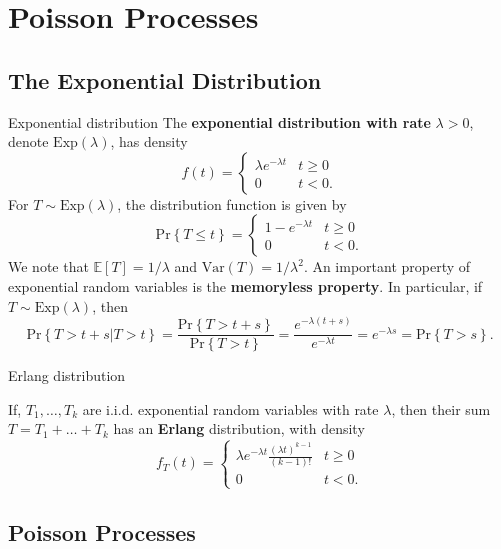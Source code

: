 \section{Poisson Processes}

\subsection{The Exponential Distribution}

\begin{defn}{Exponential distribution}{}
The \textbf{exponential distribution with rate} \(\lambda >0\), denote \(\mathrm{Exp} (\lambda )\), has density
\[
    f(t) = \begin{cases}
        \lambda e^{-\lambda t} & t \geq 0 \\
        0 & t < 0. 
    \end{cases}
\] 
For \(T\sim \mathrm{Exp}(\lambda ) \), the distribution function is given by
\[
   \mathrm{Pr} \left\{ T \leq t \right\}  = \begin{cases}
        1 - e^{-\lambda t}  & t \geq 0 \\
        0 & t < 0. 
    \end{cases}
\] We note that \(\mathbb{E}[T] =  1/\lambda  \) and \(\mathrm{Var} (T) = 1/\lambda ^{2} \). An important property of exponential random variables is the \textbf{memoryless property}.  In particular, if \(T \sim \mathrm{Exp} (\lambda )\), then 
\[
    \mathrm{Pr} \left\{ T > t + s | T > t \right\} = \frac{\mathrm{Pr} \left\{ T > t + s \right\} }{\mathrm{Pr} \left\{ T > t \right\} } = \frac{e^{-\lambda (t + s)} }{e^{-\lambda t }} = e^{-\lambda s} = \mathrm{Pr} \left\{ T > s \right\}. 
\]
\end{defn}

\begin{defn}{Erlang distribution}{}

    If, \(T_1, \dots , T_{k} \) are i.i.d. exponential random variables with rate \(\lambda \), then their sum \(T = T_1 + \dots + T_{k} \) has an \textbf{Erlang} distribution, with density
\[
    f_{T} (t) = \begin{cases}
        \lambda e^{- \lambda t}\frac{(\lambda t)^{k- 1} }{(k - 1)!}  & t \geq 0\\
        0 &t < 0.
    \end{cases}
\]

\end{defn}

\subsection{Poisson Processes}


